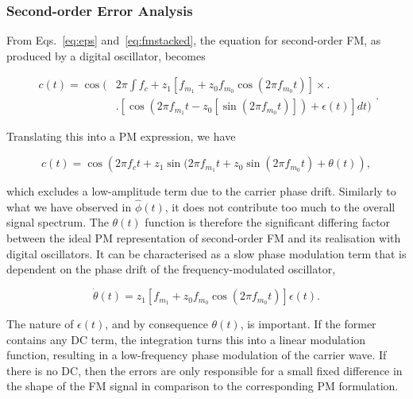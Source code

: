 \documentclass[]{interact}
\begin{document}
\subsubsection{Second-order Error Analysis}

From Eqs.~\ref{eq:eps} and~\ref{eq:fmstacked}, the equation for second-order FM, as produced by a digital oscillator, 
becomes

\begin{equation}
\begin{split}
c(t) = \cos\Bigg( &  2\pi \int f_c  + z_1\left[f_{m_1} + z_0f_{m_0} \cos(2\pi f_{m_0}t)\right] \times \Bigg.\\
&\Bigg.\left[\cos(2\pi f_{m_1} t - z_0 [\sin(2\pi f_{m_0}t)]) + \epsilon(t)\right]dt\Bigg)
\end{split}.
\end{equation}
\smallskip

Translating this into a PM expression, we have

\begin{equation}
c(t) =  \cos\left(2\pi f_c t + z_1\sin(2\pi f_{m_1}  t + z_0 \sin(2\pi f_{m_0} t) + \theta(t)  \right),
\end{equation}
\smallskip

\noindent which excludes a low-amplitude term due to the carrier phase drift. Similarly to what we have observed in $\hat{\phi}(t)$, it does not contribute too much to the overall signal spectrum. The $\theta(t)$ function is therefore the significant differing factor between the ideal PM representation of second-order FM and its realisation with digital oscillators. It can be characterised as 
a slow phase modulation term that is dependent on the phase drift of the frequency-modulated oscillator,

\begin{equation}
\dot{\theta}(t)=  z_1[f_{m_1} + z_0 f_{m_0}\cos(2\pi f_{m_0} t)]\epsilon(t).
\end{equation} 
\smallskip

The nature of $\epsilon(t)$, and by consequence $\theta(t)$, is important. If the former contains any DC term,
the integration turns this into a linear modulation function, resulting in a low-frequency phase modulation
of the carrier wave. If there is no DC, then the errors are only responsible for a small fixed difference in the shape
of the FM signal in comparison to the corresponding PM formulation. 
\end{document}
